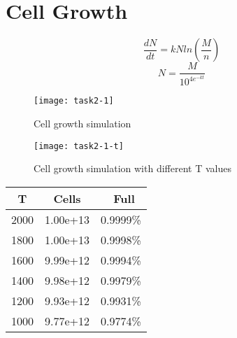 \section{Cell Growth}







\[ \frac{dN}{dt}  = kNln\left(\frac{M}{n} \right) \]
\[ N = \dfrac{M}{10^{4e^{-kt}}}  \]

\clearpage

\begin{figure}[ht]
    \centering
    \texttt{[image: task2-1]}
    \caption[Cell growth simulation]{Cell growth simulation}
    \label{fig:task2-1}
\end{figure}

\clearpage

\begin{figure}[ht]
    \centering
    \texttt{[image: task2-1-t]}
    \caption[Cell growth simulation with different T values]{Cell growth simulation with different T values}
    \label{fig:task2-1-t}
\end{figure}

\begin{center}
\begin{tabular}{c | c c} 
    T & Cells & \ Full \\
    \hline
    2000 & 1.00e+13 & 0.9999\% \\
    1800 & 1.00e+13 & 0.9998\% \\
    1600 & 9.99e+12 & 0.9994\% \\
    1400 & 9.98e+12 & 0.9979\% \\
    1200 & 9.93e+12 & 0.9931\% \\
    1000 & 9.77e+12 & 0.9774\% \\    
\end{tabular}
\end{center}

